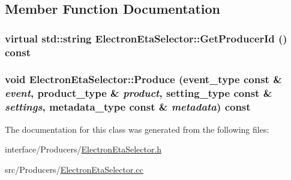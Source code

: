 \subsection{Member Function Documentation}
\hypertarget{classElectronEtaSelector_a44f2b988ce958eaad34e06e37da02c5c}{
\subsubsection[{GetProducerId}]{\setlength{\rightskip}{0pt plus 5cm}virtual std::string ElectronEtaSelector::GetProducerId () const}}
\label{classElectronEtaSelector_a44f2b988ce958eaad34e06e37da02c5c}
\hypertarget{classElectronEtaSelector_a00d27d0a73fef869f62e9d8d50c05c59}{
\subsubsection[{Produce}]{\setlength{\rightskip}{0pt plus 5cm}void ElectronEtaSelector::Produce (event\_\-type const \& {\em event}, \/  product\_\-type \& {\em product}, \/  setting\_\-type const \& {\em settings}, \/  metadata\_\-type const \& {\em metadata}) const}}
\label{classElectronEtaSelector_a00d27d0a73fef869f62e9d8d50c05c59}


The documentation for this class was generated from the following files:\begin{DoxyCompactItemize}
\item 
interface/Producers/\hyperlink{ElectronEtaSelector_8h}{ElectronEtaSelector.h}\item 
src/Producers/\hyperlink{ElectronEtaSelector_8cc}{ElectronEtaSelector.cc}\end{DoxyCompactItemize}
